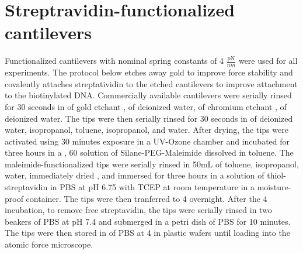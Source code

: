 \section{Streptravidin-functionalized cantilevers}

Functionalized cantilevers with nominal spring constants of 4 $\frac{\text{pN}}{nm}$  were used for all experiments. The protocol below etches away gold to improve force stability\cite{sullan_atomic_2013} and covalently attaches streptatividin to the etched cantilevers to improve attachment to the biotinylated DNA. Commercially available cantilevers  were serially rinsed for 30 seconds in  of gold etchant ,  of deionized water,  of chromium etchant ,  of deionized water. The tips were then serially rinsed for 30 seconds in  of deionized water, isopropanol, toluene, isopropanol, and water. After drying, the tips were activated using 30 minutes exposure in a UV-Ozone chamber and incubated for three hours in a , 60\degreeC{} solution of   Silane-PEG-Maleimide  dissolved in toluene. The maleimide-functionalized tips were serially rinsed in 50mL of toluene, isopropanol, water, immediately dried , and immersed for three hours in a  solution of thiol-streptavidin  in PBS at pH 6.75 with  TCEP  at room temperature in a moisture-proof container. The tips were then tranferred to 4\degreeC{} overnight. After the 4\degreeC{} incubation, to remove free streptavidin, the tips were serially rinsed in two  beakers of PBS at pH 7.4 and submerged in a  petri dish of PBS for 10 minutes. The tips were then stored in  of PBS at 4\degreeC{} in plastic wafers  until loading into the atomic force microscope. 


